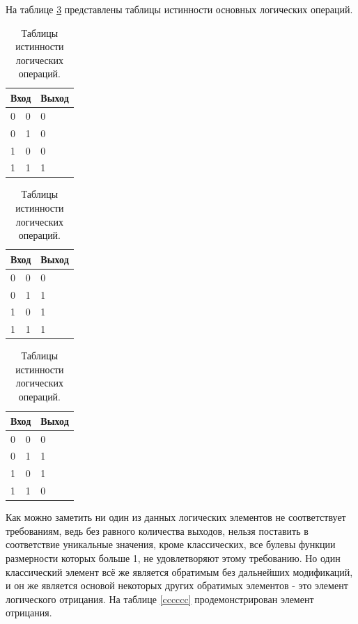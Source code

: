 \documentclass[14pt]{extarticle} %
\begin{document}
На таблице \ref{aaaaaaaaa} представлены таблицы истинности основных логических операций.
 \begin{table}[h]

	\centering
	\caption{Таблицы истинности логических операций.}
	\footnotesize
	\label{aaaaaaaaa}
	\begin{tabular}{|ll|l|} 
		\hline
		\multicolumn{2}{|l|}{Вход}  & Выход \\ \hline
		\multicolumn{1}{|l|}{0} & 0 & 0     \\ \hline
		\multicolumn{1}{|l|}{0} & 1 & 0     \\ \hline
		\multicolumn{1}{|l|}{1} & 0 & 0     \\ \hline
		\multicolumn{1}{|l|}{1} & 1 & 1     \\ \hline
	\end{tabular}
	\begin{tabular}{|ll|l|}
		\hline
		\multicolumn{2}{|l|}{Вход}  & Выход \\ \hline
		\multicolumn{1}{|l|}{0} & 0 & 0     \\ \hline
		\multicolumn{1}{|l|}{0} & 1 & 1     \\ \hline
		\multicolumn{1}{|l|}{1} & 0 & 1     \\ \hline
		\multicolumn{1}{|l|}{1} & 1 & 1     \\ \hline
	\end{tabular}
	\begin{tabular}{|ll|l|}
		\hline
		\multicolumn{2}{|l|}{Вход}  & Выход \\ \hline
		\multicolumn{1}{|l|}{0} & 0 & 0     \\ \hline
		\multicolumn{1}{|l|}{0} & 1 & 1     \\ \hline
		\multicolumn{1}{|l|}{1} & 0 & 1     \\ \hline
		\multicolumn{1}{|l|}{1} & 1 & 0     \\ \hline
	\end{tabular}
	
\end{table}

Как можно заметить ни один из данных логических элементов не соответствует требованиям, ведь без равного количества выходов, нельзя поставить в соответствие уникальные значения, кроме классических, все булевы функции размерности которых больше 1, не удовлетворяют этому требованию. Но один классический элемент всё же является обратимым без дальнейших модификаций, и он же является основой некоторых других обратимых элементов - это элемент логического отрицания. На таблице \ref{cccccc} продемонстрирован элемент отрицания.
\end{document}
